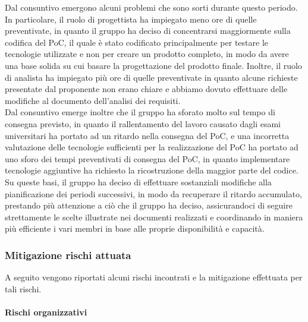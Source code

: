 Dal consuntivo emergono alcuni problemi che sono sorti durante questo periodo. 
In particolare, il ruolo di progettista ha impiegato meno ore di quelle preventivate, in quanto il gruppo ha deciso di concentrarsi maggiormente sulla codifica
del PoC, il quale è stato codificato principalmente per testare le tecnologie utilizzate e non per creare un prodotto completo, in modo da avere una base solida
su cui basare la progettazione del prodotto finale. Inoltre, il ruolo di analista ha impiegato più ore di quelle preventivate in quanto alcune richieste presentate
 dal proponente non erano chiare e abbiamo dovuto effettuare delle modifiche al documento dell'analisi dei requisiti.\\
Dal consuntivo emerge inoltre che il gruppo ha sforato molto sul tempo di consegna previsto, in quanto il rallentamento del lavoro causato dagli esami universitari
ha portato ad un ritardo nella consegna del PoC, e una incorretta valutazione delle tecnologie sufficienti per la realizzazione del PoC ha portato ad uno sforo dei
tempi preventivati di consegna del PoC, in quanto implementare tecnologie aggiuntive ha richiesto la ricostruzione della maggior parte del codice.\\
Su queste basi, il gruppo ha deciso di effettuare sostanziali modifiche alla pianificazione dei periodi successivi, in modo da recuperare il ritardo accumulato,
prestando più attenzione a ciò che il gruppo ha deciso, assicurandoci di seguire strettamente le scelte illustrate nei documenti realizzati e coordinando in maniera
più efficiente i vari membri in base alle proprie disponibilità e capacità.\\


\subsubsection{Mitigazione rischi attuata}\label{sec:consuntivo:analisi:mitigazione}

A seguito vengono riportati alcuni rischi incontrati e la mitigazione effettuata per tali rischi.\\

\paragraph{Rischi organizzativi}


